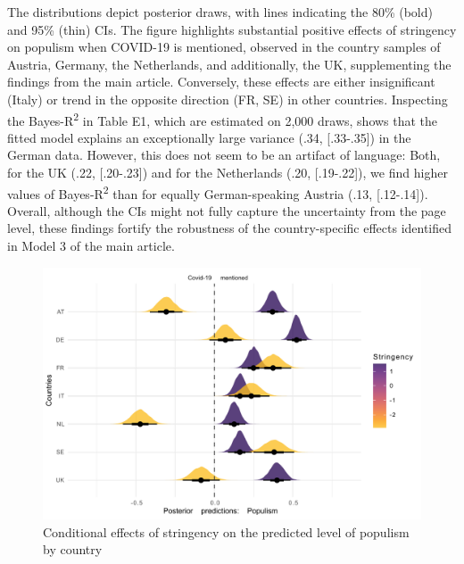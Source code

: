 \documentclass[
]{ccr}
\begin{document}
The distributions depict posterior draws, with lines indicating the 80\%
(bold) and 95\% (thin) CIs. The figure highlights substantial positive
effects of stringency on populism when COVID-19 is mentioned, observed
in the country samples of Austria, Germany, the Netherlands, and
additionally, the UK, supplementing the findings from the main article.
Conversely, these effects are either insignificant (Italy) or trend in
the opposite direction (FR, SE) in other countries. Inspecting the
Bayes-R\textsuperscript{2} in Table E1, which are estimated on 2,000
draws, shows that the fitted model explains an exceptionally large
variance (.34, {[}.33-.35{]}) in the German data. However, this does not
seem to be an artifact of language: Both, for the UK (.22,
{[}.20-.23{]}) and for the Netherlands (.20, {[}.19-.22{]}), we find
higher values of Bayes-R\textsuperscript{2} than for equally
German-speaking Austria (.13, {[}.12-.14{]}). Overall, although the CIs
might not fully capture the uncertainty from the page level, these
findings fortify the robustness of the country-specific effects
identified in Model 3 of the main article.

\begin{figure}

{\centering \includegraphics{plots/plot_strgXcov_SEP_ctry_fxdeff_20231130.pdf}

}

\caption{Conditional effects of stringency on the predicted level of
populism by country}

\end{figure}
\end{document}
